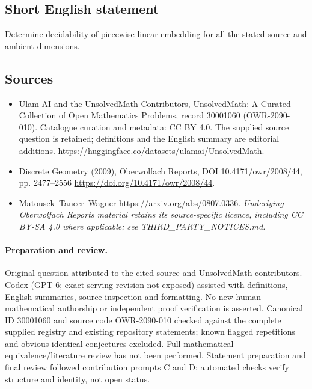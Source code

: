 \documentclass[11pt]{article}
\begin{document}
\subsection{Short English statement}
Determine decidability of piecewise-linear embedding for all the stated source and ambient dimensions.
\subsection{Sources}
\begin{itemize}
\item[\hypertarget{source:30001060:1}{S1}] Ulam AI and the UnsolvedMath Contributors, UnsolvedMath: A Curated Collection of Open Mathematics Problems, record 30001060 (OWR-2090-010). Catalogue curation and metadata: CC BY 4.0. The supplied source question is retained; definitions and the English summary are editorial additions.
\url{https://huggingface.co/datasets/ulamai/UnsolvedMath}.
\item[\hypertarget{source:30001060:2}{S2}] Discrete Geometry (2009), Oberwolfach Reports, DOI 10.4171/owr/2008/44, pp. 2477--2556
\url{https://doi.org/10.4171/owr/2008/44}.
\item[\hypertarget{source:30001060:3}{S3}] Matousek--Tancer--Wagner
\url{https://arxiv.org/abs/0807.0336}.
\textit{Underlying Oberwolfach Reports material retains its source-specific licence, including CC BY-SA 4.0 where applicable; see THIRD\_PARTY\_NOTICES.md.}
\end{itemize}
\paragraph{Preparation and review.}
Original question attributed to the cited source and UnsolvedMath contributors. Codex (GPT-6; exact serving revision not exposed) assisted with definitions, English summaries, source inspection and formatting. No new human mathematical authorship or independent proof verification is asserted. Canonical ID 30001060 and source code OWR-2090-010 checked against the complete supplied registry and existing repository statements; known flagged repetitions and obvious identical conjectures excluded. Full mathematical-equivalence/literature review has not been performed. Statement preparation and final review followed contribution prompts C and D; automated checks verify structure and identity, not open status.
\label{end:30001060}
\end{document}
